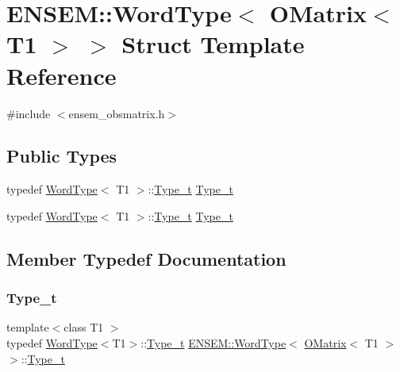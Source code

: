\hypertarget{structENSEM_1_1WordType_3_01OMatrix_3_01T1_01_4_01_4}{}\section{E\+N\+S\+EM\+:\+:Word\+Type$<$ O\+Matrix$<$ T1 $>$ $>$ Struct Template Reference}
\label{structENSEM_1_1WordType_3_01OMatrix_3_01T1_01_4_01_4}


{\ttfamily \#include $<$ensem\+\_\+obsmatrix.\+h$>$}

\subsection*{Public Types}
\begin{DoxyCompactItemize}
\item 
typedef \mbox{\hyperlink{structENSEM_1_1WordType}{Word\+Type}}$<$ T1 $>$\+::\mbox{\hyperlink{structENSEM_1_1WordType_3_01OMatrix_3_01T1_01_4_01_4_a37e42971b324dfc3027d9f416e3d7d00}{Type\+\_\+t}} \mbox{\hyperlink{structENSEM_1_1WordType_3_01OMatrix_3_01T1_01_4_01_4_a37e42971b324dfc3027d9f416e3d7d00}{Type\+\_\+t}}
\item 
typedef \mbox{\hyperlink{structENSEM_1_1WordType}{Word\+Type}}$<$ T1 $>$\+::\mbox{\hyperlink{structENSEM_1_1WordType_3_01OMatrix_3_01T1_01_4_01_4_a37e42971b324dfc3027d9f416e3d7d00}{Type\+\_\+t}} \mbox{\hyperlink{structENSEM_1_1WordType_3_01OMatrix_3_01T1_01_4_01_4_a37e42971b324dfc3027d9f416e3d7d00}{Type\+\_\+t}}
\end{DoxyCompactItemize}


\subsection{Member Typedef Documentation}
\mbox{\label{structENSEM_1_1WordType_3_01OMatrix_3_01T1_01_4_01_4_a37e42971b324dfc3027d9f416e3d7d00}} 
\subsubsection{\texorpdfstring{Type\_t}{Type\_t}\hspace{0.1cm}{\footnotesize\ttfamily [1/2]}}
{\footnotesize\ttfamily template$<$class T1 $>$ \\
typedef \mbox{\hyperlink{structENSEM_1_1WordType}{Word\+Type}}$<$T1$>$\+::\mbox{\hyperlink{structENSEM_1_1WordType_3_01OMatrix_3_01T1_01_4_01_4_a37e42971b324dfc3027d9f416e3d7d00}{Type\+\_\+t}} \mbox{\hyperlink{structENSEM_1_1WordType}{E\+N\+S\+E\+M\+::\+Word\+Type}}$<$ \mbox{\hyperlink{classENSEM_1_1OMatrix}{O\+Matrix}}$<$ T1 $>$ $>$\+::\mbox{\hyperlink{structENSEM_1_1WordType_3_01OMatrix_3_01T1_01_4_01_4_a37e42971b324dfc3027d9f416e3d7d00}{Type\+\_\+t}}}

